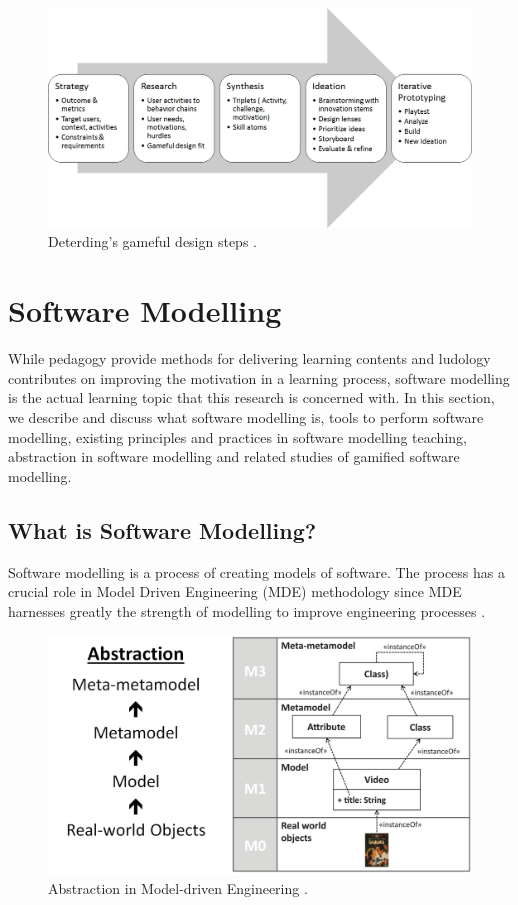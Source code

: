 \documentclass[12pt, a4paper]{report}
\begin{document}
{\begin{figure}[ht]
\centering
\includegraphics[width=12cm]{gameful-steps}
\caption{Deterding's gameful design steps \cite{deterding2015lens}.}
\label{fig:gameful-steps}
\end{figure}


\section{Software Modelling}
While pedagogy provide methods for delivering learning contents and ludology contributes on improving the motivation in a learning process, software modelling is the actual learning topic that this research is concerned with. In this section, we describe and discuss what software modelling is, tools to perform software modelling, existing principles and practices in software modelling teaching, abstraction in software modelling and related studies of gamified software modelling.    

\subsection{What is Software Modelling?}
Software modelling is a process of creating models of software. The process has a crucial role in Model Driven Engineering (MDE) methodology since MDE harnesses greatly the strength of modelling to improve engineering processes \cite{brambilla2012model}.  

\begin{figure}[!b]
\centering
\includegraphics[width=13cm]{abstraction}
\caption{Abstraction in Model-driven Engineering \cite{brambilla2012model}.}
\label{abstraction}
\end{figure}

}
\end{document}
